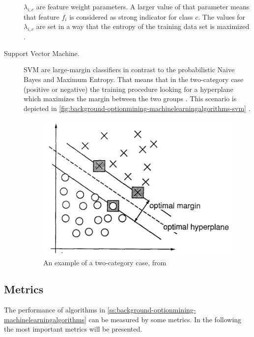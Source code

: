 \begin{description}
	$\lambda_{i,c}$ are feature weight parameters. A larger value of that parameter means that feature $f_i$ is considered as strong indicator for class $c$.
	The values for $\lambda_{i,c}$ are set in a way that the entropy of the training data set is maximized \cite{Pang2002}.
		
	\item[Support Vector Machine.]
	\ac{SVM} are large-margin classifiers in contrast to the probabilistic Naive Bayes and Maximum Entropy.
	That means that in the two-category case (positive or negative) the training procedure looking for a hyperplane which maximizes the margin between the two groups \cite{Pang2002}.
	This scenario is depicted in \autoref{fig:background-optionmining-machinelearningalgorithms-svm} \cite[p. 275]{Cortes1995}.
		
	\begin{figure}[ht]
		\centering
		\includegraphics[width=.7\textwidth]{images/svm.png}
		\caption{An example of a two-category case, from \cite[p. 275]{Cortes1995}}
		\label{fig:background-optionmining-machinelearningalgorithms-svm}
	\end{figure}
	
\end{description}

\subsection{Metrics}
\label{ss:background-optionmining-metrics}

The performance of algorithms in \cref{ss:background-optionmining-machinelearningalgorithms} can be measured by some metrics.
In the following the most important metrics will be presented.

